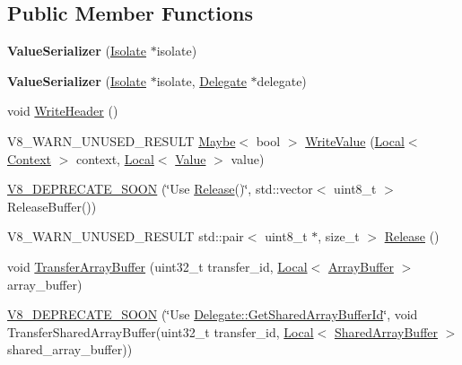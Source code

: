 \subsection*{Public Member Functions}
\begin{DoxyCompactItemize}
\item 
\mbox{\label{classv8_1_1ValueSerializer_a51d1b6f00c48dc3577baeeaa3bdbaf09}} 
{\bfseries Value\+Serializer} (\mbox{\hyperlink{classv8_1_1Isolate}{Isolate}} $\ast$isolate)
\item 
\mbox{\label{classv8_1_1ValueSerializer_a5f37e7f6087acda9a943fb50216e0895}} 
{\bfseries Value\+Serializer} (\mbox{\hyperlink{classv8_1_1Isolate}{Isolate}} $\ast$isolate, \mbox{\hyperlink{classv8_1_1ValueSerializer_1_1Delegate}{Delegate}} $\ast$delegate)
\item 
void \mbox{\hyperlink{classv8_1_1ValueSerializer_ac0bdf1a7731ee4e93823dabdfa8c8661}{Write\+Header}} ()
\item 
V8\+\_\+\+W\+A\+R\+N\+\_\+\+U\+N\+U\+S\+E\+D\+\_\+\+R\+E\+S\+U\+LT \mbox{\hyperlink{classv8_1_1Maybe}{Maybe}}$<$ bool $>$ \mbox{\hyperlink{classv8_1_1ValueSerializer_a32b08083cb7d83bf3b117b61f327ea23}{Write\+Value}} (\mbox{\hyperlink{classv8_1_1Local}{Local}}$<$ \mbox{\hyperlink{classv8_1_1Context}{Context}} $>$ context, \mbox{\hyperlink{classv8_1_1Local}{Local}}$<$ \mbox{\hyperlink{classv8_1_1Value}{Value}} $>$ value)
\item 
\mbox{\hyperlink{classv8_1_1ValueSerializer_a2db107206f6f7965eb17c170cecfafaf}{V8\+\_\+\+D\+E\+P\+R\+E\+C\+A\+T\+E\+\_\+\+S\+O\+ON}} (\char`\"{}Use \mbox{\hyperlink{classv8_1_1ValueSerializer_abab0c48c963cd11f98478a4ccc04509c}{Release}}()\char`\"{}, std\+::vector$<$ uint8\+\_\+t $>$ Release\+Buffer())
\item 
V8\+\_\+\+W\+A\+R\+N\+\_\+\+U\+N\+U\+S\+E\+D\+\_\+\+R\+E\+S\+U\+LT std\+::pair$<$ uint8\+\_\+t $\ast$, size\+\_\+t $>$ \mbox{\hyperlink{classv8_1_1ValueSerializer_abab0c48c963cd11f98478a4ccc04509c}{Release}} ()
\item 
void \mbox{\hyperlink{classv8_1_1ValueSerializer_a27007f2530a496275ccf7b8846f1d9c5}{Transfer\+Array\+Buffer}} (uint32\+\_\+t transfer\+\_\+id, \mbox{\hyperlink{classv8_1_1Local}{Local}}$<$ \mbox{\hyperlink{classv8_1_1ArrayBuffer}{Array\+Buffer}} $>$ array\+\_\+buffer)
\item 
\mbox{\hyperlink{classv8_1_1ValueSerializer_a2cd82786e44182adee305f71be57019c}{V8\+\_\+\+D\+E\+P\+R\+E\+C\+A\+T\+E\+\_\+\+S\+O\+ON}} (\char`\"{}Use \mbox{\hyperlink{classv8_1_1ValueSerializer_1_1Delegate_a963946ef185d992552e8d9e0e4016137}{Delegate\+::\+Get\+Shared\+Array\+Buffer\+Id}}\char`\"{}, void Transfer\+Shared\+Array\+Buffer(uint32\+\_\+t transfer\+\_\+id, \mbox{\hyperlink{classv8_1_1Local}{Local}}$<$ \mbox{\hyperlink{classv8_1_1SharedArrayBuffer}{Shared\+Array\+Buffer}} $>$ shared\+\_\+array\+\_\+buffer))

\end{DoxyCompactItemize}
